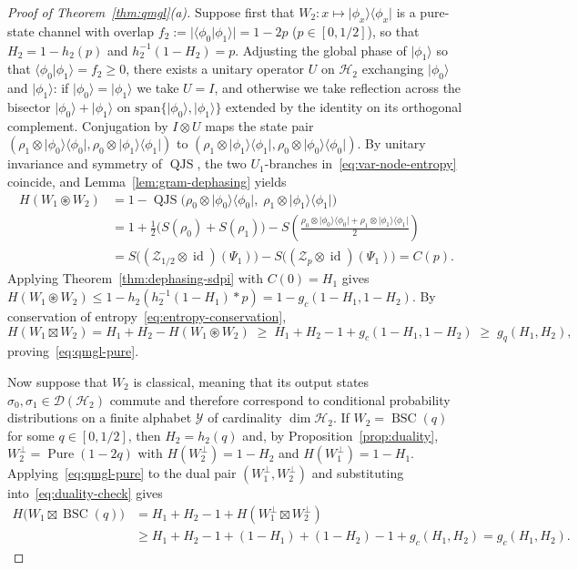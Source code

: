 \documentclass[10pt,a4paper]{article}
\numberwithin{equation}{section}
\theoremstyle{plain}
\theoremstyle{definition}
\theoremstyle{remark}
\DeclareMathOperator{\QJS}{QJS}
\DeclareMathOperator{\BSC}{BSC}
\DeclareMathOperator{\Pure}{Pure}
\DeclareMathOperator{\id}{id}
\newcommand{\cH}{\mathcal{H}}
\newcommand{\cD}{\mathcal{D}}
\newcommand{\cZ}{\mathcal{Z}}
\newcommand{\cY}{\mathcal{Y}}
\newcommand{\ket}[1]{\lvert #1 \rangle}
\newcommand{\ketbra}[1]{\lvert #1 \rangle\langle #1 \rvert}
\newcommand{\braket}[2]{\langle #1 \vert #2 \rangle}
\begin{document}
\begin{proof}[Proof of Theorem~\ref{thm:qmgl}(a)]
Suppose first that $W_2 : x \mapsto \ketbra{\phi_x}$ is a pure-state channel with overlap $f_2 := \lvert \braket{\phi_0}{\phi_1} \rvert = 1 - 2p$ ($p \in [0, 1/2]$), so that $H_2 = 1 - h_2(p)$ and $h_2^{-1}(1 - H_2) = p$. Adjusting the global phase of $\ket{\phi_1}$ so that $\braket{\phi_0}{\phi_1} = f_2 \ge 0$, there exists a unitary operator $U$ on $\cH_2$ exchanging $\ket{\phi_0}$ and $\ket{\phi_1}$: if $\ket{\phi_0} = \ket{\phi_1}$ we take $U = I$, and otherwise we take reflection across the bisector $\ket{\phi_0} + \ket{\phi_1}$ on $\mathrm{span}\{\ket{\phi_0}, \ket{\phi_1}\}$ extended by the identity on its orthogonal complement. Conjugation by $I \otimes U$ maps the state pair $(\rho_1 \otimes \ketbra{\phi_0}, \rho_0 \otimes \ketbra{\phi_1})$ to $(\rho_1 \otimes \ketbra{\phi_1}, \rho_0 \otimes \ketbra{\phi_0})$. By unitary invariance and symmetry of $\QJS$, the two $U_1$-branches in~\eqref{eq:var-node-entropy} coincide, and Lemma~\ref{lem:gram-dephasing} yields
\begin{align*}
H(W_1 \circledast W_2) &= 1 - \QJS\bigl(\rho_0 \otimes \ketbra{\phi_0},\; \rho_1 \otimes \ketbra{\phi_1}\bigr)\\
&= 1 + \frac{1}{2}\bigl(S(\rho_0) + S(\rho_1)\bigr) - S\!\left(\frac{\rho_0 \otimes \ketbra{\phi_0} + \rho_1 \otimes \ketbra{\phi_1}}{2}\right)\\
&= S\bigl((\cZ_{1/2} \otimes \id)(\Psi_1)\bigr) - S\bigl((\cZ_p \otimes \id)(\Psi_1)\bigr) = C(p).
\end{align*}
Applying Theorem~\ref{thm:dephasing-sdpi} with $C(0) = H_1$ gives $H(W_1 \circledast W_2) \le 1 - h_2(h_2^{-1}(1 - H_1) * p) = 1 - g_c(1 - H_1, 1 - H_2)$. By conservation of entropy~\eqref{eq:entropy-conservation},
\[
H(W_1 \boxtimes W_2) = H_1 + H_2 - H(W_1 \circledast W_2) \;\ge\; H_1 + H_2 - 1 + g_c(1 - H_1, 1 - H_2) \;\ge\; g_q(H_1, H_2),
\]
proving~\eqref{eq:qmgl-pure}.

Now suppose that $W_2$ is classical, meaning that its output states $\sigma_0, \sigma_1 \in \cD(\cH_2)$ commute and therefore correspond to conditional probability distributions on a finite alphabet $\cY$ of cardinality $\dim \cH_2$. If $W_2 = \BSC(q)$ for some $q \in [0, 1/2]$, then $H_2 = h_2(q)$ and, by Proposition~\ref{prop:duality}, $W_2^{\perp} = \Pure(1 - 2q)$ with $H(W_2^{\perp}) = 1 - H_2$ and $H(W_1^{\perp}) = 1 - H_1$. Applying~\eqref{eq:qmgl-pure} to the dual pair $(W_1^{\perp}, W_2^{\perp})$ and substituting into~\eqref{eq:duality-check} gives
\begin{align*}
H\bigl(W_1 \boxtimes \BSC(q)\bigr) &= H_1 + H_2 - 1 + H(W_1^{\perp} \boxtimes W_2^{\perp})\\
&\ge H_1 + H_2 - 1 + (1 - H_1) + (1 - H_2) - 1 + g_c(H_1, H_2) = g_c(H_1, H_2).
\end{align*}


\end{proof}
\end{document}
